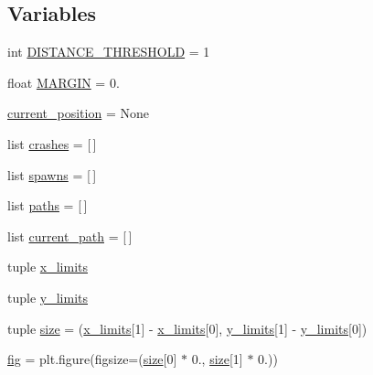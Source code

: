 \subsection*{Variables}
\begin{DoxyCompactItemize}
\item 
int \hyperlink{namespacesimulation__tools_1_1plot__path_afb91f4177ffee5b67bf7f0cc55e7cb03}{D\+I\+S\+T\+A\+N\+C\+E\+\_\+\+T\+H\+R\+E\+S\+H\+O\+LD} = 1
\item 
float \hyperlink{namespacesimulation__tools_1_1plot__path_af2865d4107cb8424c272f2214d7bc7e3}{M\+A\+R\+G\+IN} = 0.
\item 
\hyperlink{namespacesimulation__tools_1_1plot__path_a6630a10cacfc0f746555fc66794d66bb}{current\+\_\+position} = None
\item 
list \hyperlink{namespacesimulation__tools_1_1plot__path_aab95480216fce1ffe96669023bf16c42}{crashes} = \mbox{[}$\,$\mbox{]}
\item 
list \hyperlink{namespacesimulation__tools_1_1plot__path_ae4cd76527e66dbb4471b94b4a6a86b4f}{spawns} = \mbox{[}$\,$\mbox{]}
\item 
list \hyperlink{namespacesimulation__tools_1_1plot__path_abb450e0cef13d97a4f8368a6d00ff843}{paths} = \mbox{[}$\,$\mbox{]}
\item 
list \hyperlink{namespacesimulation__tools_1_1plot__path_a35535ef467ee1df5ae54979d2d740601}{current\+\_\+path} = \mbox{[}$\,$\mbox{]}
\item 
tuple \hyperlink{namespacesimulation__tools_1_1plot__path_a3f392b0b6695e4825d03441dce1f06a7}{x\+\_\+limits}
\item 
tuple \hyperlink{namespacesimulation__tools_1_1plot__path_a7c4e9f4c49238053d939ab44ccc11f36}{y\+\_\+limits}
\item 
tuple \hyperlink{namespacesimulation__tools_1_1plot__path_ad669b594ec1c564d7c50a086fa97ab52}{size} = (\hyperlink{namespacesimulation__tools_1_1plot__path_a3f392b0b6695e4825d03441dce1f06a7}{x\+\_\+limits}\mbox{[}1\mbox{]} -\/ \hyperlink{namespacesimulation__tools_1_1plot__path_a3f392b0b6695e4825d03441dce1f06a7}{x\+\_\+limits}\mbox{[}0\mbox{]}, \hyperlink{namespacesimulation__tools_1_1plot__path_a7c4e9f4c49238053d939ab44ccc11f36}{y\+\_\+limits}\mbox{[}1\mbox{]} -\/ \hyperlink{namespacesimulation__tools_1_1plot__path_a7c4e9f4c49238053d939ab44ccc11f36}{y\+\_\+limits}\mbox{[}0\mbox{]})
\item 
\hyperlink{namespacesimulation__tools_1_1plot__path_a610eb9753d8fff77f2b12abc288a9e98}{fig} = plt.\+figure(figsize=(\hyperlink{namespacesimulation__tools_1_1plot__path_ad669b594ec1c564d7c50a086fa97ab52}{size}\mbox{[}0\mbox{]} $\ast$ 0., \hyperlink{namespacesimulation__tools_1_1plot__path_ad669b594ec1c564d7c50a086fa97ab52}{size}\mbox{[}1\mbox{]} $\ast$ 0.))

\end{DoxyCompactItemize}
